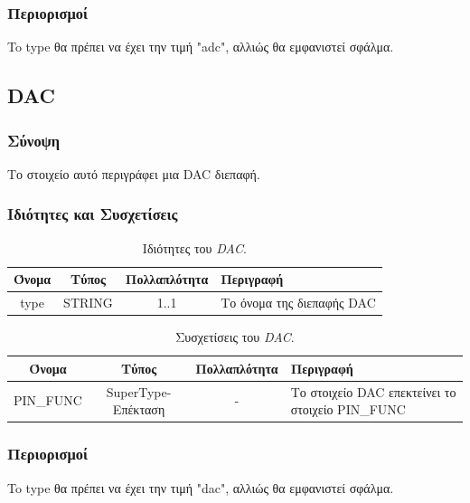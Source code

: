\subsubsection*{Περιορισμοί}

\noindent To type θα πρέπει να έχει την τιμή "adc", αλλιώς θα εμφανιστεί σφάλμα.

\subsection{DAC}
\label{subsec:dac}

\subsubsection*{Σύνοψη}

\noindent Το στοιχείο αυτό περιγράφει μια DAC διεπαφή.

\subsubsection*{Ιδιότητες και Συσχετίσεις}

\begin{table}[H]
	\begin{center}
		\caption{Ιδιότητες του \textit{DAC}.}
		\label{tab:dac1}
		\begin{tabular}{ | c | c | c| m{5.5cm} | }
			\hline
			\rowcolor{Gray}
			Όνομα & Τύπος & Πολλαπλότητα & Περιγραφή \\
			\hline
			type & STRING & 1..1 & Το όνομα της διεπαφής DAC \\
			\hline
		\end{tabular}
	\end{center}
\end{table}

\begin{table}[H]
	\begin{center}
		\caption{Συσχετίσεις του \textit{DAC}.}
		\label{tab:dac2}
		\begin{tabular}{ | c | c | c| m{5.5cm} | }
			\hline
			\rowcolor{Gray}
			Όνομα & Τύπος & Πολλαπλότητα & Περιγραφή \\
			\hline
			PIN\_FUNC & SuperType-Επέκταση & - &  Το στοιχείο DAC επεκτείνει το στοιχείο PIN\_FUNC \\
			\hline
		\end{tabular}
	\end{center}
\end{table}

\subsubsection*{Περιορισμοί}

\noindent To type θα πρέπει να έχει την τιμή "dac", αλλιώς θα εμφανιστεί σφάλμα.